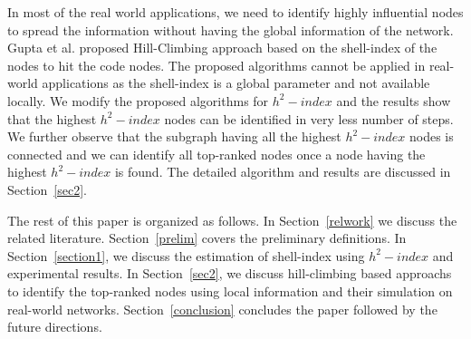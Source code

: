 \documentclass[12pt,3p]{article}
\begin{document}


In most of the real world applications, we need to identify highly influential nodes to spread the information without having the global information of the network. Gupta et al. \cite{gupta2016pseudo} proposed Hill-Climbing approach based on the shell-index of the nodes to hit the code nodes. The proposed algorithms cannot be applied in real-world applications as the shell-index is a global parameter and not available locally. We modify the proposed algorithms for $h^2-index$ and the results show that the highest $h^2-index$ nodes can be identified in very less number of steps. We further observe that the subgraph having all the highest $h^2-index$ nodes is connected and we can identify all top-ranked nodes once a node having the highest $h^2-index$ is found. The detailed algorithm and results are discussed in Section~\ref{sec2}.


The rest of this paper is organized as follows. In Section~\ref{relwork} we discuss the related literature. Section~\ref{prelim} covers the preliminary definitions. In Section~\ref{section1}, we discuss the estimation of shell-index using $h^2-index$ and experimental results. In Section~\ref{sec2}, we discuss hill-climbing based approachs to identify the top-ranked nodes using local information and their simulation on real-world networks. Section~\ref{conclusion} concludes the paper followed by the future directions.
\end{document}
